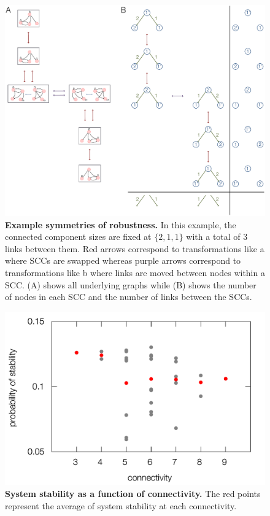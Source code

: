 
\begin{figure}[!ht]
\centering
\noindent\includegraphics[width=0.9\columnwidth]{fig/robustnesssymmetries.pdf}
\caption{{\bf Example symmetries of robustness.} In this example, the connected component sizes are fixed at $\{2,1,1\}$ with a total of $3$ links between them. Red arrows correspond to transformations like  a where SCCs are swapped whereas purple arrows correspond to transformations like  b where links are moved between nodes within a SCC. (A) shows all underlying graphs while (B) shows the number of nodes in each SCC and the number of links between the SCCs.}
\label{fig:robustnesssymmetries}
\end{figure}

\pagebreak

\begin{figure}[!ht]
\centering
\noindent\includegraphics[width=0.8\columnwidth]{fig/apstab3x3.pdf}
\caption{{\bf System stability as a function of connectivity.} The red points represent the average of system stability at each connectivity.}
\label{fig:apstab3x3}
\end{figure}

